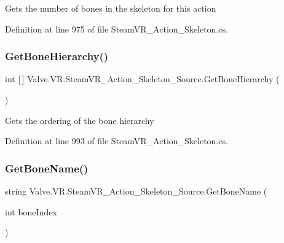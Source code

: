 Gets the number of bones in the skeleton for this action 



Definition at line 975 of file Steam\+V\+R\+\_\+\+Action\+\_\+\+Skeleton.\+cs.

\mbox{\label{class_valve_1_1_v_r_1_1_steam_v_r___action___skeleton___source_a7c4f3a37fa7947fc0cb31c131765bd6e}} 
\subsubsection{\texorpdfstring{GetBoneHierarchy()}{GetBoneHierarchy()}}
{\footnotesize\ttfamily int \mbox{[}$\,$\mbox{]} Valve.\+V\+R.\+Steam\+V\+R\+\_\+\+Action\+\_\+\+Skeleton\+\_\+\+Source.\+Get\+Bone\+Hierarchy (\begin{DoxyParamCaption}{ }\end{DoxyParamCaption})}



Gets the ordering of the bone hierarchy 



Definition at line 993 of file Steam\+V\+R\+\_\+\+Action\+\_\+\+Skeleton.\+cs.

\mbox{\label{class_valve_1_1_v_r_1_1_steam_v_r___action___skeleton___source_a0c91ca98beac96d53d38bdcd80238344}} 
\subsubsection{\texorpdfstring{GetBoneName()}{GetBoneName()}}
{\footnotesize\ttfamily string Valve.\+V\+R.\+Steam\+V\+R\+\_\+\+Action\+\_\+\+Skeleton\+\_\+\+Source.\+Get\+Bone\+Name (\begin{DoxyParamCaption}\item[{int}]{bone\+Index }\end{DoxyParamCaption})}



